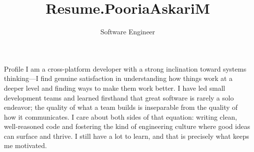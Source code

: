 \documentclass[
	a4paper, %
	12pt, %
]{resume} %
\title{Resume.PooriaAskariM}
\subtitle{Software Engineer}  %
\begin{document}
\makeheader
\raggedright


\begin{rSection}{Profile}
\smallskip
I am a cross-platform developer with a strong inclination toward systems thinking---I find genuine satisfaction in understanding how things work at a deeper level and finding ways to make them work better. I have led small development teams and learned firsthand that great software is rarely a solo endeavor; the quality of what a team builds is inseparable from the quality of how it communicates. I care about both sides of that equation: writing clean, well-reasoned code and fostering the kind of engineering culture where good ideas can surface and thrive. I still have a lot to learn, and that is precisely what keeps me motivated.
\end{rSection}

\end{document}
